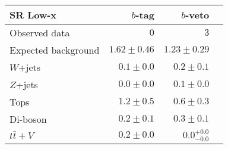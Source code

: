 \begin{tabular*}{\textwidth}{@{\extracolsep{\fill}}lrrr}
\toprule
\textbf{SR Low-x} & $b$-tag &  $b$-veto \\
\midrule

Observed data & $0$ & $3$ \\
\midrule
Expected background & $1.62 \pm 0.46$ & $1.23 \pm 0.29$ \\
\midrule
$W$+jets & $0.1 \pm 0.0$ & $0.2 \pm 0.1$ \\
$Z$+jets & $0.0 \pm 0.0$ & $0.1 \pm 0.0$ \\
Tops & $1.2 \pm 0.5$ & $0.6 \pm 0.3$ \\
Di-boson & $0.2 \pm 0.1$ & $0.3 \pm 0.1$ \\
$t\bar{t}+V$ & $0.2 \pm 0.0$ & $0.0_{-0.0}^{+0.0}$ \\


\bottomrule
\end{tabular*}




